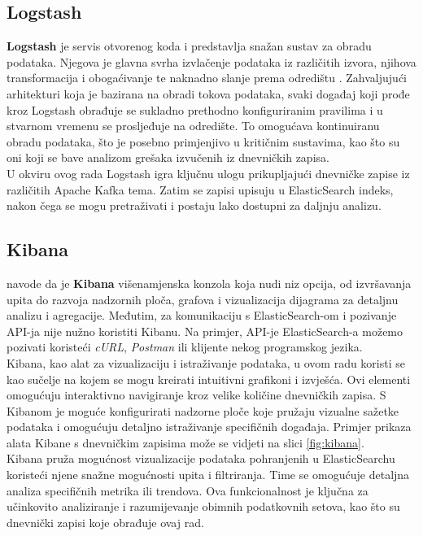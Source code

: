 \documentclass[times, utf8, diplomski]{fer}
\begin{document}
\subsection{Logstash}
\label{sec:logstash}

\textbf{Logstash} je servis otvorenog koda i predstavlja snažan sustav za obradu podataka. Njegova je glavna svrha izvlačenje podataka iz različitih izvora, njihova transformacija i obogaćivanje te naknadno slanje prema odredištu \citep{konda_elasticsearch_2023}. Zahvaljujući arhitekturi koja je bazirana na obradi tokova podataka, svaki događaj koji prođe kroz Logstash obrađuje se sukladno prethodno konfiguriranim pravilima i u stvarnom vremenu se prosljeđuje na odredište. To omogućava kontinuiranu obradu podataka, što je posebno primjenjivo u kritičnim sustavima, kao što su oni koji se bave analizom grešaka izvučenih iz dnevničkih zapisa.\\

U okviru ovog rada Logstash igra ključnu ulogu prikupljajući dnevničke zapise iz različitih Apache Kafka tema. Zatim se zapisi upisuju u ElasticSearch indeks, nakon čega se mogu pretraživati i postaju lako dostupni za daljnju analizu.

\subsection{Kibana}
\label{sec:kibana}

\citet{gormley_elasticsearch_2015} navode da je \textbf{Kibana} višenamjenska konzola koja nudi niz opcija, od izvršavanja upita do razvoja nadzornih ploča, grafova i vizualizacija dijagrama za detaljnu analizu i agregacije. Međutim, za komunikaciju s ElasticSearch-om i pozivanje API-ja nije nužno koristiti Kibanu. Na primjer, API-je ElasticSearch-a možemo pozivati koristeći \emph{cURL}, \emph{Postman} ili klijente nekog programskog jezika.\\

Kibana, kao alat za vizualizaciju i istraživanje podataka, u ovom radu koristi se kao sučelje na kojem se mogu kreirati intuitivni grafikoni i izvješća. Ovi elementi omogućuju interaktivno navigiranje kroz velike količine dnevničkih zapisa. S Kibanom je moguće konfigurirati nadzorne ploče koje pružaju vizualne sažetke podataka i omogućuju detaljno istraživanje specifičnih događaja. Primjer prikaza alata Kibane s dnevničkim zapisima može se vidjeti na slici \ref{fig:kibana}.\\

Kibana pruža mogućnost vizualizacije podataka pohranjenih u ElasticSearchu koristeći njene snažne mogućnosti upita i filtriranja. Time se omogućuje detaljna analiza specifičnih metrika ili trendova. Ova funkcionalnost je ključna za učinkovito analiziranje i razumijevanje obimnih podatkovnih setova, kao što su dnevnički zapisi koje obrađuje ovaj rad.
\end{document}
